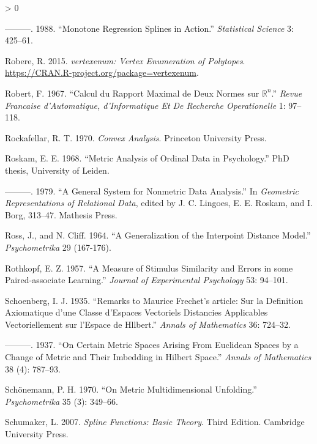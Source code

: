 \documentclass[
  12pt,
]{book}
\newlength{\cslhangindent}
\newenvironment{CSLReferences}[2] %
 {%
  \setlength{\parindent}{0pt}
  \ifodd #1 \everypar{\setlength{\hangindent}{\cslhangindent}}\ignorespaces\fi
  \ifnum #2 > 0
  \setlength{\parskip}{#2\baselineskip}
  \fi
 }%
 {}
\theoremstyle{definition}
\theoremstyle{definition}
\theoremstyle{definition}
\theoremstyle{definition}
\theoremstyle{remark}
\begin{document}
\begin{CSLReferences}{1}{0}
\leavevmode\hypertarget{ref-ramsay_88}{}%
---------. 1988. {``{Monotone Regression Splines in Action}.''} \emph{Statistical Science} 3: 425--61.

\leavevmode\hypertarget{ref-robere_15}{}%
Robere, R. 2015. \emph{{vertexenum: Vertex Enumeration of Polytopes}}. \url{https://CRAN.R-project.org/package=vertexenum}.

\leavevmode\hypertarget{ref-robert_67}{}%
Robert, F. 1967. {``{Calcul du Rapport Maximal de Deux Normes sur \(\mathbb{R}^n\)}.''} \emph{Revue Francaise d'Automatique, d'Informatique Et De Recherche Operationelle} 1: 97--118.

\leavevmode\hypertarget{ref-rockafellar_70}{}%
Rockafellar, R. T. 1970. \emph{Convex Analysis}. Princeton University Press.

\leavevmode\hypertarget{ref-roskam_68}{}%
Roskam, E. E. 1968. {``{Metric Analysis of Ordinal Data in Psychology}.''} PhD thesis, University of Leiden.

\leavevmode\hypertarget{ref-roskam_79}{}%
---------. 1979. {``{A General System for Nonmetric Data Analysis}.''} In \emph{{Geometric Representations of Relational Data}}, edited by J. C. Lingoes, E. E. Roskam, and I. Borg, 313--47. Mathesis Press.

\leavevmode\hypertarget{ref-ross_cliff_64}{}%
Ross, J., and N. Cliff. 1964. {``{A Generalization of the Interpoint Distance Model}.''} \emph{Psychometrika} 29 (167-176).

\leavevmode\hypertarget{ref-rothkopf_57}{}%
Rothkopf, E. Z. 1957. {``{A Measure of Stimulus Similarity and Errors in some Paired-associate Learning}.''} \emph{Journal of Experimental Psychology} 53: 94--101.

\leavevmode\hypertarget{ref-schoenberg_35}{}%
Schoenberg, I. J. 1935. {``{Remarks to Maurice Frechet's article: Sur la Definition Axiomatique d'une Classe d'Espaces Vectoriels Distancies Applicables Vectoriellement sur l'Espace de Hllbert}.''} \emph{Annals of Mathematics} 36: 724--32.

\leavevmode\hypertarget{ref-schoenberg_37}{}%
---------. 1937. {``{On Certain Metric Spaces Arising From Euclidean Spaces by a Change of Metric and Their Imbedding in Hilbert Space}.''} \emph{Annals of Mathematics} 38 (4): 787--93.

\leavevmode\hypertarget{ref-schoenemann_70}{}%
Schönemann, P. H. 1970. {``{On Metric Multidimensional Unfolding}.''} \emph{Psychometrika} 35 (3): 349--66.

\leavevmode\hypertarget{ref-schumaker_07}{}%
Schumaker, L. 2007. \emph{{Spline Functions: Basic Theory}}. Third Edition. Cambridge University Press.


\end{CSLReferences}
\end{document}
